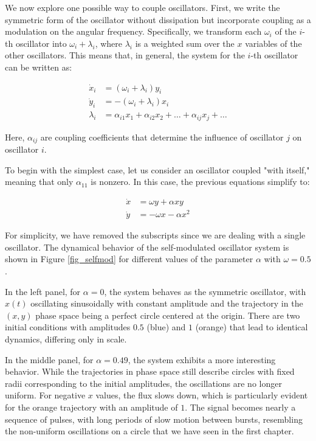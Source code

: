 \documentclass{article}
\begin{document}
We now explore one possible way to couple oscillators. 
First, we write the symmetric form of the oscillator without dissipation but incorporate coupling as a modulation on the angular frequency. 
Specifically, we transform each $\omega_i$ of the $i$-th oscillator into $\omega_i + \lambda_i$, where $\lambda_i$ is a weighted sum over the $x$ variables of the other oscillators. 
This means that, in general, the system for the $i$-th oscillator can be written as:

\begin{subequations} \label{eq_coupled_oscillators}
\begin{align}
    \dot{x}_i & = (\omega_i + \lambda_i) y_i \\
    \dot{y}_i & = -(\omega_i + \lambda_i) x_i \\
    \lambda_i & = \alpha_{i1} x_1 + \alpha_{i2} x_2 + \dots + \alpha_{ij} x_j + \dots
\end{align}
\end{subequations}

Here, $\alpha_{ij}$ are coupling coefficients that determine the influence of oscillator $j$ on oscillator $i$.

To begin with the simplest case, let us consider an oscillator coupled "with itself," meaning that only $\alpha_{11}$ is nonzero. In this case, the previous equations simplify to:

\begin{subequations} \label{eq_self_coupled_oscillator}
\begin{align}
    \dot{x} & = \omega y + \alpha xy \\
    \dot{y} & = -\omega x - \alpha x^2
\end{align}
\end{subequations}

For simplicity, we have removed the subscripts since we are dealing with a single oscillator.
The dynamical behavior of the self-modulated oscillator system is shown in Figure \ref{fig_selfmod} for different values of the parameter $\alpha$ with $\omega = 0.5$. 

In the left panel, for $\alpha = 0$, the system behaves as the symmetric oscillator, with $x(t)$ oscillating sinusoidally with constant amplitude and the trajectory in the $(x, y)$ phase space being a perfect circle centered at the origin. 
There are two initial conditions with amplitudes $0.5$ (blue) and $1$ (orange) that lead to identical dynamics, differing only in scale.

In the middle panel, for $\alpha = 0.49$, the system exhibits a more interesting behavior. 
While the trajectories in phase space still describe circles with fixed radii corresponding to the initial amplitudes, the oscillations are no longer uniform. For negative $x$ values, the flux slows down, which is particularly evident for the orange trajectory with an amplitude of $1$. 
The signal becomes nearly a sequence of pulses, with long periods of slow motion between bursts, resembling the non-uniform oscillations on a circle that we have seen in the first chapter. 
\end{document}
